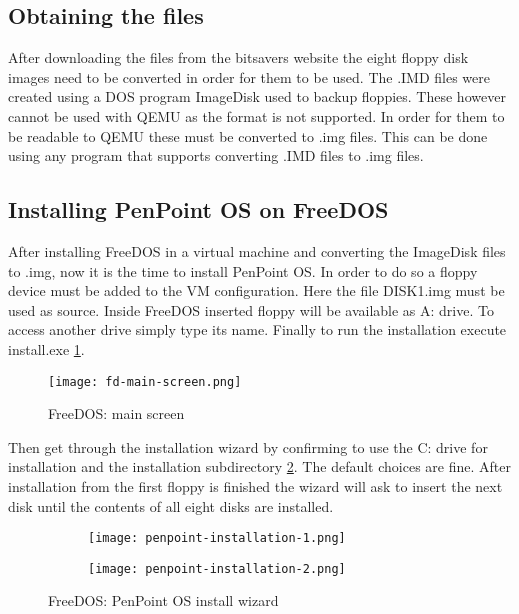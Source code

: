 \subsection{Obtaining the files}

After downloading the files from the bitsavers website the eight floppy disk
images need to be converted in order for them to be used. The .IMD files were
created using a DOS program ImageDisk used to backup floppies. These however
cannot be used with QEMU as the format is not supported. In order for them to
be readable to QEMU these must be converted to .img files. This can be done
using any program that supports converting .IMD files to .img files.

\subsection{Installing PenPoint OS on FreeDOS}

After installing FreeDOS in a virtual machine and converting the ImageDisk
files to .img, now it is the time to install PenPoint OS. In order to do so
a floppy device must be added to the VM configuration. Here the file DISK1.img
must be used as source. Inside FreeDOS inserted floppy will be available as A:
drive. To access another drive simply type its name. Finally to run the
installation execute install.exe \ref{fig:fd-main-screen}.

\begin{figure}[H]
    \centering
    \texttt{[image: fd-main-screen.png]}
    \caption{FreeDOS: main screen}
    \label{fig:fd-main-screen}
\end{figure}

Then get through the installation wizard by confirming to use the C: drive for
installation and the installation subdirectory \ref{fig:penpoint-installation}.
The default choices are fine.  After installation from the first floppy is
finished the wizard will ask to insert the next disk until the contents of all
eight disks are installed.

\begin{figure}[H]
    \centering
    \begin{subfigure}[b]{0.45\linewidth}
        \texttt{[image: penpoint-installation-1.png]}
    \end{subfigure}
    \hfill
    \begin{subfigure}[b]{0.45\linewidth}
        \texttt{[image: penpoint-installation-2.png]}
    \end{subfigure}
    \caption{FreeDOS: PenPoint OS install wizard}
    \label{fig:penpoint-installation}
\end{figure}

